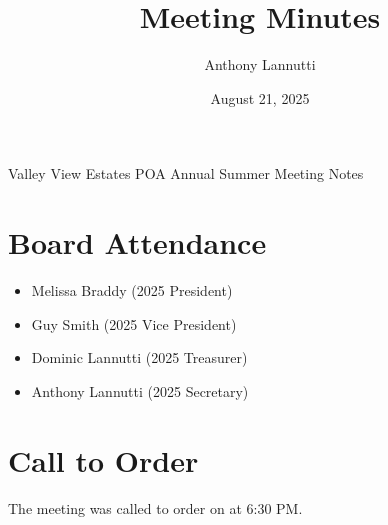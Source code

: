 \documentclass[12pt,a4paper]{article}
\author{Anthony Lannutti}
\date{August 21, 2025}
\title{Meeting Minutes}
\begin{document}
\begin{center}
  Valley View Estates POA Annual Summer Meeting Notes\break{}
  \@date{}
\end{center}

\section*{Board Attendance}
\begin{itemize}
  \item Melissa Braddy (2025 President)
  \item Guy Smith (2025 Vice President)
  \item Dominic Lannutti (2025 Treasurer)
  \item Anthony Lannutti (2025 Secretary)
\end{itemize}

\section*{Call to Order}
\begin{flushleft}
The meeting was called to order on \@date{} at 6:30 PM\@.
\end{flushleft}
\end{document}
